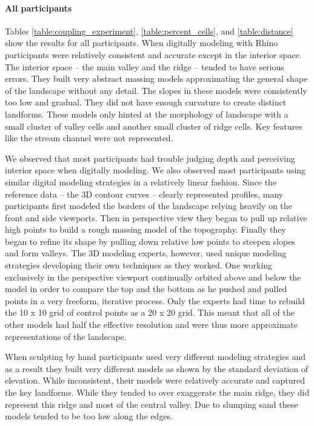 \documentclass[prodmode,acmtochi]{acmsmall} %
\begin{document}

\paragraph{All participants}
Tables \ref{table:coupling_experiment},
\ref{table:percent_cells}, 
and \ref{table:distance}
show the results for all participants. 
%
When digitally modeling with Rhino
participants were relatively 
consistent and accurate except in the interior space.
The interior space -- the main valley and the ridge -- 
tended to have serious errors.
%
They built very abstract massing models 
approximating the general shape of the landscape
without any detail. 
%
The slopes in these models 
were consistently too low and gradual.
They did not have enough curvature 
to create distinct landforms. 
%
These models only hinted at 
the morphology of landscape
with a small cluster of valley cells
and another small cluster of ridge cells.  
Key features like the stream channel
were not represented. 

We observed that most participants had trouble
judging depth and perceiving interior space 
when digitally modeling. 
We also observed most participants 
using similar digital modeling strategies 
in a relatively linear fashion.
Since the reference data -- the 3D contour curves -- 
clearly represented profiles, 
many participants first modeled
the borders of the landscape
relying heavily
on the front and side viewports.
Then in perspective view 
they began to pull up relative high points 
to build a rough massing model of the topography.
Finally they began to refine its shape 
by pulling down relative low points to 
steepen slopes and form valleys.
%
The 3D modeling experts, however, 
used unique modeling strategies
developing their own techniques as they worked.
One 
working exclusively in the perspective viewport
continually orbited above and below the model 
in order to compare the top and the bottom
as he pushed and pulled points
in a very freeform, iterative process. 
%
Only the experts had time to rebuild the 
10 x 10 grid of control points as a 20 x 20 grid. 
This meant that all of the other models
had half the effective resolution
and were thus more approximate
representations of the landscape. 

When sculpting by hand 
participants used very different modeling strategies 
and as a result they built very different models
as shown by the standard deviation of elevation.
While inconsistent, 
their models were relatively accurate
and captured the key landforms.
While they tended to over exaggerate the main ridge, 
they did represent
this ridge and most of the central valley.
Due to slumping sand
these models tended to be too low along the edges. 
\end{document}
